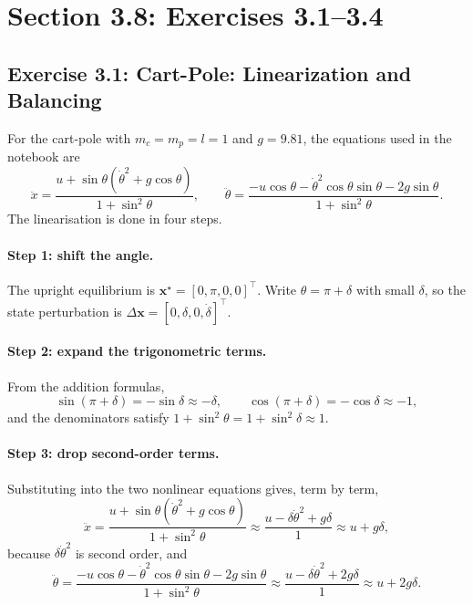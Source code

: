 \documentclass[11pt]{report}
\newcommand{\bx}{\mathbf{x}}
\begin{document}
\section{Section 3.8: Exercises 3.1--3.4}
\label{sec:s38}

\subsection{Exercise 3.1: Cart-Pole: Linearization and Balancing}

For the cart-pole with $m_c=m_p=l=1$ and $g=9.81$, the equations used in the
notebook are
\[
\ddot x=\frac{u+\sin\theta(\dot\theta^2+g\cos\theta)}{1+\sin^2\theta},
\qquad
\ddot\theta=\frac{-u\cos\theta-\dot\theta^2\cos\theta\sin\theta-2g\sin\theta}
{1+\sin^2\theta}.
\]
The linearisation is done in four steps.

\paragraph{Step 1: shift the angle.}
The upright equilibrium is $\bx^\star=[0,\pi,0,0]^\top$.  Write
$\theta=\pi+\delta$ with small $\delta$, so the state perturbation is
$\Delta\bx=[0,\delta,0,\dot\delta]^\top$.

\paragraph{Step 2: expand the trigonometric terms.}
From the addition formulas,
\[
\sin(\pi+\delta)=-\sin\delta\approx-\delta,\qquad
\cos(\pi+\delta)=-\cos\delta\approx-1,
\]
and the denominators satisfy $1+\sin^2\theta=1+\sin^2\delta\approx1$.

\paragraph{Step 3: drop second-order terms.}
Substituting into the two nonlinear equations gives, term by term,
\[
\ddot x=\frac{u+\sin\theta(\dot\theta^2+g\cos\theta)}{1+\sin^2\theta}
\approx \frac{u-\delta\dot\theta^2+g\delta}{1}\approx u+g\delta,
\]
because $\delta\dot\theta^2$ is second order, and
\[
\ddot\theta=\frac{-u\cos\theta-\dot\theta^2\cos\theta\sin\theta-2g\sin\theta}
{1+\sin^2\theta}
\approx \frac{u-\delta\dot\theta^2+2g\delta}{1}\approx u+2g\delta .
\]
\end{document}
